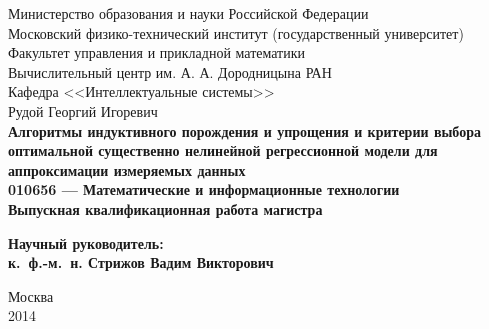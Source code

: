 \documentclass[12pt,a4paper]{article}
\begin{document}
{
\renewcommand{\baselinestretch}{1}
\thispagestyle{empty}
\begin{center}
    \sc
        Министерство образования и науки Российской Федерации\\
        Московский физико-технический институт
        {\rm(государственный университет)}\\
        Факультет управления и прикладной математики\\
        Вычислительный центр им. А. А. Дородницына РАН\\
        Кафедра <<Интеллектуальные системы>>\\[35mm]
    \rm\large
        Рудой Георгий Игоревич\\[10mm]
    \bf\Large
		Алгоритмы индуктивного порождения и упрощения и критерии выбора оптимальной существенно нелинейной регрессионной модели для аппроксимации измеряемых данных\\[10mm]
    \rm\normalsize
        010656 --- Математические и информационные технологии\\[10mm]
    \sc
        Выпускная квалификационная работа магистра\\[10mm]
\end{center}
\hfill\parbox{80mm}{
    \begin{flushleft}
    \bf
        Научный руководитель:\\
    \rm
        к.~ф.-м.~н. Стрижов Вадим Викторович\\[5cm]
    \end{flushleft}
}
\begin{center}
    Москва\\
    2014
\end{center}
}

\newpage
\tableofcontents
\newpage
\end{document}
